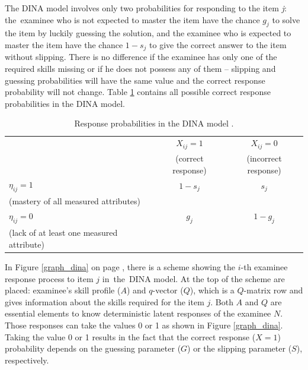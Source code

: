 \documentclass[english]{pwr_wmat_praca_dyplomowa}
\theoremstyle{plain}
\numberwithin{theorem}{chapter}
\theoremstyle{definition}
\numberwithin{theorem}{chapter}
\begin{document}
	The DINA model involves only two probabilities for responding to the item \textit{j}: the~examinee who is not expected to master the item have the chance $g_j$ to solve the item by luckily guessing the solution, and the examinee who is expected to master the item have the chance $1 - s_j$ to give the correct answer to the item without slipping. There is no difference if the examinee has only one of the required skills missing or if he does not possess any of them -- slipping and guessing probabilities will have the same value and the correct response probability will not change. Table \ref{tab:response_prob} contains all possible correct response probabilities in the DINA model.
	
	\begin{table}[H]
		\centering
		\begin{tabular}{l c c} 
			\hline
			{\rule{0pt}{3ex}} & $X_{ij} = 1$ & $X_{ij} = 0$ \\
			& (correct response) & (incorrect response) \\ [0.5ex]
			\hline 
			{\rule{0pt}{3ex}} $\eta_{ij} = 1$ & $1- s_j$ & $s_j$ \\ 
			(mastery of all measured attributes) & & \\[1ex] 
			$\eta_{ij} = 0$ & $g_j$ & $1-g_j$ \\ 
			(lack of at least one measured attribute) & & \\[0.5ex] 
			\hline
		\end{tabular}
		\caption{Response probabilities in the DINA model \cite{book_tables}.}
		\label{tab:response_prob} 
	\end{table}
	
	In Figure \ref{graph_dina} on page \pageref{graph_dina}, there is a scheme showing the $i$-th examinee response process to item $j$ in~the~DINA model. At the top of the scheme are placed: examinee's skill profile ($A$) and $q$-vector ($Q$), which is a $Q$-matrix row and gives information about the skills required for the item $j$. Both $A$ and $Q$ are essential elements to know deterministic latent responses of the examinee $N$. Those responses can take the values 0 or 1 as shown in Figure \ref{graph_dina}. Taking the value 0 or 1 results in the fact that the correct response ($X=1$) probability depends on the guessing parameter ($G$) or the slipping parameter ($S$), respectively.
	
\end{document}
